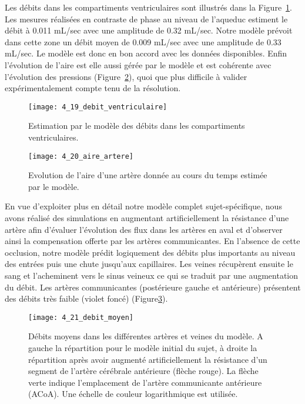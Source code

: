 Les débits dans les compartiments ventriculaires sont illustrés dans la Figure~\ref{fig:4_19_debit_ventriculaire}. Les mesures
réalisées en contraste de phase au niveau de l’aqueduc estiment le débit à 0.011 mL/sec avec une
amplitude de 0.32 mL/sec. Notre modèle prévoit dans cette zone un débit moyen de 0.009 mL/sec
avec une amplitude de 0.33 mL/sec. Le modèle est donc en bon accord avec les données disponibles.
Enfin l’évolution de l’aire est elle aussi gérée par le modèle et est cohérente avec l’évolution des
pressions (Figure~\ref{fig:4_20_aire_artere}), quoi que plus difficile à valider expérimentalement compte tenu de la résolution.\\
\begin{figure}[!t]
\centering
\texttt{[image: 4\_19\_debit\_ventriculaire]}
\caption{Estimation par le modèle des débits dans les compartiments ventriculaires.}
\label{fig:4_19_debit_ventriculaire}	
\end{figure}
\begin{figure}[!t]
\centering
\texttt{[image: 4\_20\_aire\_artere]}
\caption{Evolution de l'aire d'une artère donnée au cours du temps estimée par le modèle.}
\label{fig:4_20_aire_artere}	
\end{figure}
En vue d’exploiter plus en détail notre modèle complet sujet-spécifique, nous avons réalisé des
simulations en augmentant artificiellement la résistance d’une artère afin d’évaluer l’évolution des flux
dans les artères en aval et d’observer ainsi la compensation offerte par les artères communicantes. En
l’absence de cette occlusion, notre modèle prédit logiquement des débits plus importants au niveau
des entrées puis une chute jusqu’aux capillaires. Les veines récupèrent ensuite le sang et l’acheminent
vers le sinus veineux ce qui se traduit par une augmentation du débit. Les artères communicantes
(postérieure gauche et antérieure) présentent des débits très faible (violet foncé) (Figure\ref{fig:4_21_debit_moyen}).\\
\begin{figure}[!t]
\centering
\texttt{[image: 4\_21\_debit\_moyen]}
\caption{Débits moyens dans les différentes artères et veines du modèle. A gauche la répartition pour le modèle initial du
sujet, à droite la répartition après avoir augmenté artificiellement la résistance d’un segment de l’artère cérébrale
antérieure (flèche rouge). La flèche verte indique l’emplacement de l’artère communicante antérieure (ACoA). Une échelle
de couleur logarithmique est utilisée.}
\label{fig:4_21_debit_moyen}	
\end{figure}
